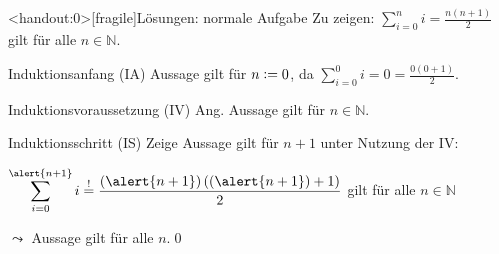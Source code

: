 {\begin{frame}<handout:0>[fragile]{Lösungen: normale Aufgabe}
    Zu zeigen: $\displaystyle\sum_{i=0}^{n} i = \frac{n(n+1)}{2}$ gilt für alle $n \in \mathbb{N}$.
    \begin{alertblock}{Induktionsanfang (IA)}
        Aussage gilt für $n\vcentcolon= 0$, da $\displaystyle\sum_{i=0}^{0} i = 0 = \frac{0(0+1)}{2}$.
    \end{alertblock}
    \begin{alertblock}{Induktionsvoraussetzung (IV)}
        Ang. Aussage gilt für $n \in\mathbb{N}$.
    \end{alertblock}
    \begin{alertblock}{Induktionsschritt (IS)}
        Zeige Aussage gilt für $n+1$ unter Nutzung der IV:\par
        $\displaystyle\sum_{i=0}^{\alert{n+1}} i \overset{!}{=} \frac{(\alert{n+1})\left((\alert{n+1})+1\right)}{2}$ gilt für alle $n \in \mathbb{N}$
    \end{alertblock}
    \alert{$\leadsto$ Aussage gilt für alle $n$.}\qed
\end{frame}
}


